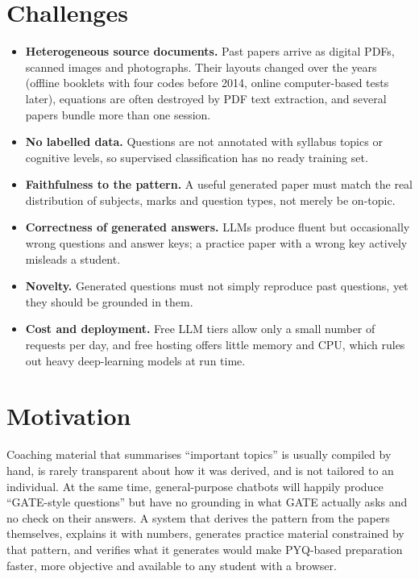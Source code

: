 \section{Challenges}
\begin{itemize}
  \item \textbf{Heterogeneous source documents.} Past papers arrive as digital PDFs, scanned images and photographs. Their
        layouts changed over the years (offline booklets with four codes before 2014, online computer-based tests later),
        equations are often destroyed by PDF text extraction, and several papers bundle more than one session.
  \item \textbf{No labelled data.} Questions are not annotated with syllabus topics or cognitive levels, so supervised
        classification has no ready training set.
  \item \textbf{Faithfulness to the pattern.} A useful generated paper must match the real distribution of subjects,
        marks and question types, not merely be on-topic.
  \item \textbf{Correctness of generated answers.} LLMs produce fluent but occasionally wrong questions and answer keys; a
        practice paper with a wrong key actively misleads a student.
  \item \textbf{Novelty.} Generated questions must not simply reproduce past questions, yet they should be grounded in
        them.
  \item \textbf{Cost and deployment.} Free LLM tiers allow only a small number of requests per day, and free hosting
        offers little memory and CPU, which rules out heavy deep-learning models at run time.
\end{itemize}

\section{Motivation}
Coaching material that summarises ``important topics'' is usually compiled by hand, is rarely transparent about how it
was derived, and is not tailored to an individual. At the same time, general-purpose chatbots will happily produce
``GATE-style questions'' but have no grounding in what GATE actually asks and no check on their answers. A system that
derives the pattern from the papers themselves, explains it with numbers, generates practice material constrained by
that pattern, and verifies what it generates would make PYQ-based preparation faster, more objective and available to
any student with a browser.

